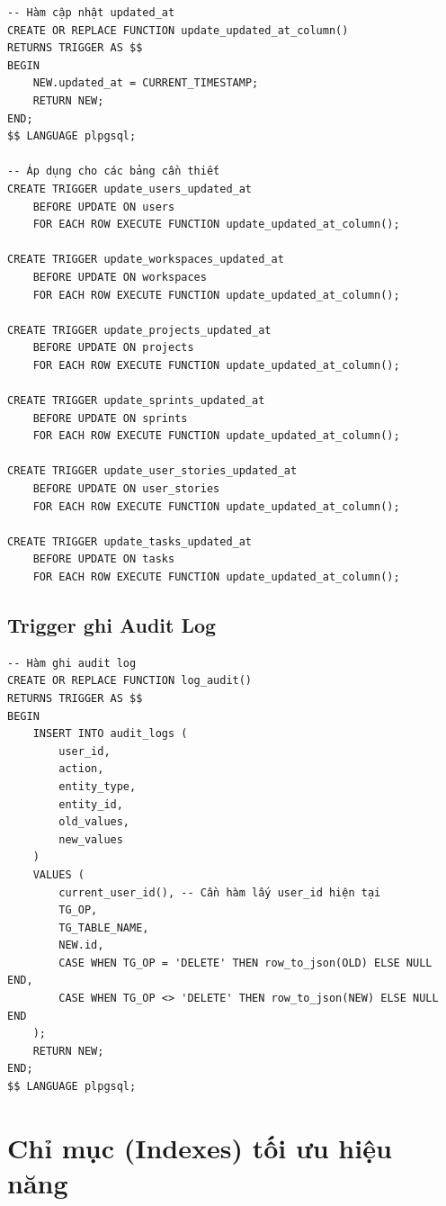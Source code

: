 \documentclass[12pt,a4paper]{report}
\begin{document}
\begin{verbatim}
-- Hàm cập nhật updated_at
CREATE OR REPLACE FUNCTION update_updated_at_column()
RETURNS TRIGGER AS $$
BEGIN
    NEW.updated_at = CURRENT_TIMESTAMP;
    RETURN NEW;
END;
$$ LANGUAGE plpgsql;

-- Áp dụng cho các bảng cần thiết
CREATE TRIGGER update_users_updated_at
    BEFORE UPDATE ON users
    FOR EACH ROW EXECUTE FUNCTION update_updated_at_column();

CREATE TRIGGER update_workspaces_updated_at
    BEFORE UPDATE ON workspaces
    FOR EACH ROW EXECUTE FUNCTION update_updated_at_column();

CREATE TRIGGER update_projects_updated_at
    BEFORE UPDATE ON projects
    FOR EACH ROW EXECUTE FUNCTION update_updated_at_column();

CREATE TRIGGER update_sprints_updated_at
    BEFORE UPDATE ON sprints
    FOR EACH ROW EXECUTE FUNCTION update_updated_at_column();

CREATE TRIGGER update_user_stories_updated_at
    BEFORE UPDATE ON user_stories
    FOR EACH ROW EXECUTE FUNCTION update_updated_at_column();

CREATE TRIGGER update_tasks_updated_at
    BEFORE UPDATE ON tasks
    FOR EACH ROW EXECUTE FUNCTION update_updated_at_column();
\end{verbatim}

\subsection{Trigger ghi Audit Log}

\begin{verbatim}
-- Hàm ghi audit log
CREATE OR REPLACE FUNCTION log_audit()
RETURNS TRIGGER AS $$
BEGIN
    INSERT INTO audit_logs (
        user_id,
        action,
        entity_type,
        entity_id,
        old_values,
        new_values
    )
    VALUES (
        current_user_id(), -- Cần hàm lấy user_id hiện tại
        TG_OP,
        TG_TABLE_NAME,
        NEW.id,
        CASE WHEN TG_OP = 'DELETE' THEN row_to_json(OLD) ELSE NULL END,
        CASE WHEN TG_OP <> 'DELETE' THEN row_to_json(NEW) ELSE NULL END
    );
    RETURN NEW;
END;
$$ LANGUAGE plpgsql;
\end{verbatim}

\section{Chỉ mục (Indexes) tối ưu hiệu năng}
\end{document}

